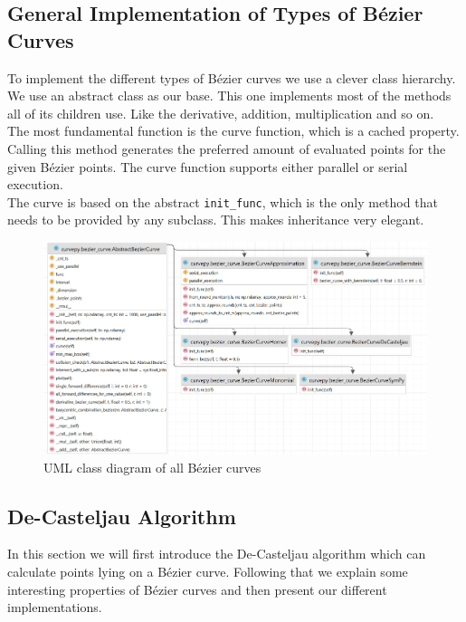 \subsection{General Implementation of Types of Bézier Curves}
To implement the different types of Bézier curves we use a clever class hierarchy. \\

We use an abstract class as our base. This one implements most of the methods all of its children use. Like the derivative, addition, multiplication and so on. \\

The most fundamental function is the curve function, which is a cached property. Calling this method generates the preferred amount of evaluated points for the given Bézier points. The curve function supports either parallel or serial execution.\\

The curve is based on the abstract \texttt{init\_func}, which is the only method that needs to be provided by any subclass. This makes inheritance very elegant.

\begin{figure}[H]
    \centering
    \includegraphics[width=\textwidth]{uml.png}
    \caption{UML class diagram of all Bézier curves}
    \label{fig:my_label}
\end{figure}
\newpage
\subsection{De-Casteljau Algorithm}
In this section we will first introduce the De-Casteljau algorithm which can calculate points lying on a Bézier curve. Following that we explain some interesting properties of Bézier curves and then present our different implementations.

